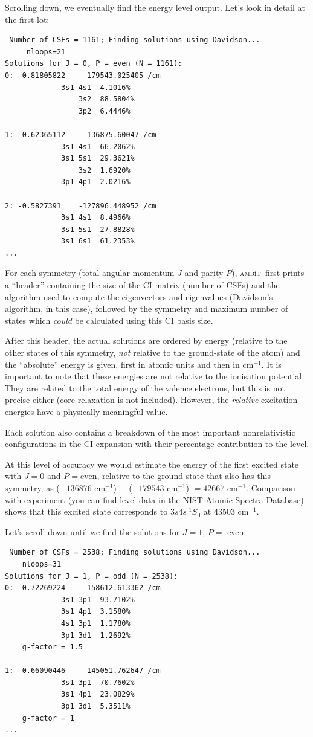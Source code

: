\documentclass{report}
\newcommand{\ambit}{\textsc{amb}{\footnotesize i}\textsc{t}}
\begin{document}
Scrolling down, we eventually find the energy level output. Let's look in detail at the first lot:
\begin{verbatim}
 Number of CSFs = 1161; Finding solutions using Davidson...
     nloops=21
Solutions for J = 0, P = even (N = 1161):
0: -0.81805822    -179543.025405 /cm
             3s1 4s1  4.1016%
                 3s2  88.5804%
                 3p2  6.4446%

1: -0.62365112    -136875.60047 /cm
             3s1 4s1  66.2062%
             3s1 5s1  29.3621%
                 3s2  1.6920%
             3p1 4p1  2.0216%

2: -0.5827391    -127896.448952 /cm
             3s1 4s1  8.4966%
             3s1 5s1  27.8828%
             3s1 6s1  61.2353%
...
\end{verbatim}

For each symmetry (total angular momentum $J$ and parity $P$), \ambit\ first prints a ``header'' containing the size of the CI matrix (number of CSFs) and the algorithm used to compute the eigenvectors and eigenvalues (Davidson's algorithm, in this case), followed by the symmetry and maximum number of states which \emph{could} be calculated using this CI basis size.

After this header, the actual solutions are ordered by energy (relative to the other states of this symmetry, \emph{not} relative to the ground-state of the atom) and the ``absolute'' energy is given,
first in atomic units and then in cm$^{-1}$. It is important to note that these energies are not
relative to the ionisation potential. They are related to the total energy of the valence electrons, but this is not precise either (core relaxation is not included). However, the \emph{relative} excitation energies have a physically meaningful value.

Each solution also contains a breakdown of the most important nonrelativistic configurations in the CI expansion with their percentage contribution to the level.

At this level of accuracy we would estimate the energy of the first excited state with $J = 0$ and $P = \mathrm{even}$, relative to the ground state that also has this symmetry, as ($-136876$ cm$^{-1}$) $-$ ($-179543$ cm$^{-1}$) $= 42667$ cm$^{-1}$. Comparison with experiment (you can find level data in the \href{https://www.nist.gov/pml/atomic-spectra-database}{NIST Atomic Spectra Database}) shows that this excited state corresponds to $3s4s\ ^1S_0$ at 43503 cm$^{-1}$.

Let's scroll down until we find the solutions for $J = 1$, $P =$ even:
\begin{verbatim}
 Number of CSFs = 2538; Finding solutions using Davidson...
    nloops=31
Solutions for J = 1, P = odd (N = 2538):
0: -0.72269224    -158612.613362 /cm
             3s1 3p1  93.7102%
             3s1 4p1  3.1580%
             4s1 3p1  1.1780%
             3p1 3d1  1.2692%
    g-factor = 1.5

1: -0.66090446    -145051.762647 /cm
             3s1 3p1  70.7602%
             3s1 4p1  23.0829%
             3p1 3d1  5.3511%
    g-factor = 1
...
\end{verbatim}
\end{document}
